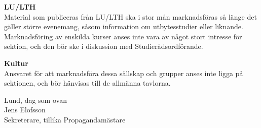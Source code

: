 \documentclass{dsekkallelse}
\begin{document}
\textbf{LU/LTH}\\
Material som publiceras från LU/LTH ska i stor mån marknadsföras så länge det gäller
större evenemang, såsom information om utbytesstudier eller liknande. Marknadsföring
av enskilda kurser anses inte vara av något stort intresse för sektion, och den bör ske i
diskussion med Studierådsordförande.

\textbf{Kultur}\\
Ansvaret för att marknadsföra dessa sällskap och grupper anses inte ligga på sektionen,
och bör hänvisas till de allmänna tavlorna.

\newpage

Lund, dag som ovan\\

Jens Elofsson \\
Sekreterare, tillika Propagandamästare
\end{document}
